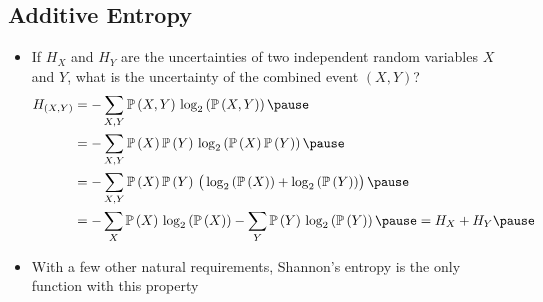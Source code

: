 
\begin{slide}
\section[-2]{Additive Entropy}

\begin{PauseHighLight}
  \begin{itemize}
  \item If $H_X$ and $H_Y$ are the uncertainties of two independent random
    variables $X$ and $Y$, what is the uncertainty of the combined
    event $(X,Y)$?
    \begin{align*}
      H_{(X,Y)}
      &= -\sum_{X,Y} \Prob{X,Y} \, \logtwo{\Prob{X, Y}}\pause\\
      &= -\sum_{X,Y} \Prob{X}\Prob{Y} \, \logtwo{\Prob{X} \Prob{Y}}\pause\\
      &= -\sum_{X,Y} \Prob{X}\Prob{Y} \,\left(  \strut\logtwo{\Prob{X}}+
        \logtwo{\Prob{Y}} \right)\pause\\
      &= -\sum_X \Prob{X}\,\logtwo{\Prob{X}} - \sum_Y
        \Prob{Y}\,\logtwo{\Prob{Y}}\pause
        = H_X + H_Y\pause
    \end{align*}
  \item With a few other natural requirements, Shannon's entropy is
    the only function with this property\pause
  \end{itemize}
\end{PauseHighLight}

\end{slide}


\Outline %

